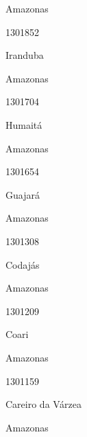 \documentclass[
  letterpaper,
]{report}
\begin{document}
\n    

\n    

\n      

Amazonas

\n      

1301852

\n      

Iranduba

\n    

\n    

\n      

Amazonas

\n      

1301704

\n      

Humaitá

\n    

\n    

\n      

Amazonas

\n      

1301654

\n      

Guajará

\n    

\n    

\n      

Amazonas

\n      

1301308

\n      

Codajás

\n    

\n    

\n      

Amazonas

\n      

1301209

\n      

Coari

\n    

\n    

\n      

Amazonas

\n      

1301159

\n      

Careiro da Várzea

\n    

\n    

\n      

Amazonas

\n      
\end{document}

